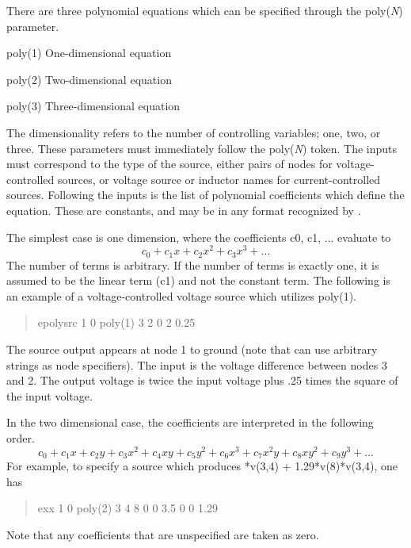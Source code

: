 There are three polynomial equations which can be specified through the
{\vt poly({\it N\/})} parameter.
\begin{description}
\item{\vt poly(1) \rm One-dimensional equation}
\item{\vt poly(2) \rm Two-dimensional equation}
\item{\vt poly(3) \rm Three-dimensional equation}
\end{description}
The dimensionality refers to the number of controlling variables; one,
two, or three.  These parameters must immediately follow the {\vt
poly({\it N\/})} token.  The inputs must correspond to the type of the
source, either pairs of nodes for voltage-controlled sources, or
voltage source or inductor names for current-controlled sources. 
Following the inputs is the list of polynomial coefficients which
define the equation.  These are constants, and may be in any format
recognized by {\WRspice}.

The simplest case is one dimension, where the coefficients {\vt c0, c1, ...}
evaluate to
\begin{displaymath}
c_0 + c_1x + c_2x^2 + c_3x^3 + ...
\end{displaymath}
The number of terms is arbitrary.  If the number of terms is exactly one,
it is assumed to be the linear term ({\vt c1}) and not the constant
term.  The following is an example of a voltage-controlled voltage source
which utilizes {\vt poly(1)}.
\begin{quote}\vt
epolysrc 1 0 poly(1) 3 2 0 2 0.25
\end{quote}
The source output appears at node 1 to ground (note that {\WRspice} can use
arbitrary strings as node specifiers).  The input is the voltage difference
between nodes 3 and 2.  The output voltage is twice the input voltage
plus .25 times the square of the input voltage.

In the two dimensional case, the coefficients are interpreted in the
following order.
\begin{displaymath}
c_0 + c_1x + c_2y + c_3x^2 + c_4xy + c_5y^2 + c_6x^3 + c_7x^2y +
c_8xy^2 + c_9y^3 + ...
\end{displaymath}
For example, to specify a source which produces
{*v(3,4) + 1.29*v(8)*v(3,4)}, one has
\begin{quote}
exx 1 0 poly(2) 3 4 8 0 0 3.5 0 0 1.29
\end{quote}
Note that any coefficients that are unspecified are taken as zero.

